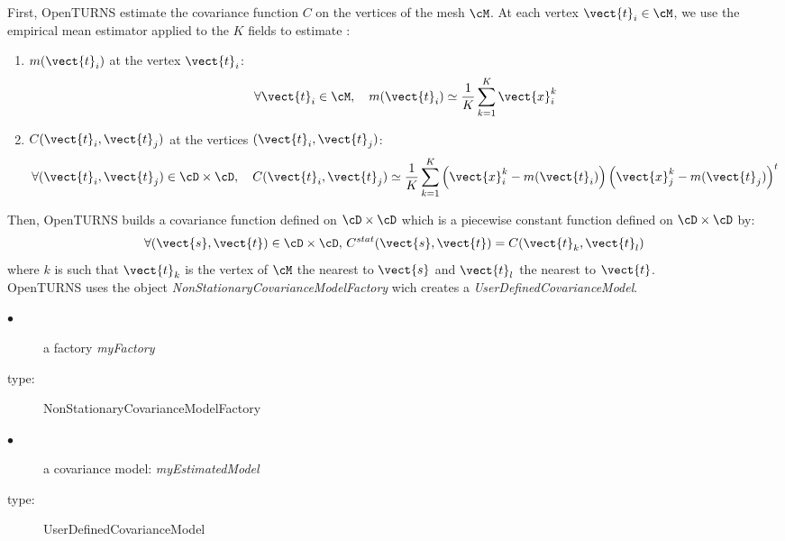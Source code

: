 First, OpenTURNS estimate the covariance function $C$ on the vertices of the mesh $\cM$. At each vertex $\vect{t}_i \in \cM$, we use the empirical mean estimator applied to the $K$ fields  to estimate :
\begin{enumerate}
\item  $m(\vect{t}_i)$ at the vertex $\vect{t}_i$:
  \begin{equation}\label{meanestim}
    \displaystyle  \forall \vect{t}_i \in \cM, \quad m(\vect{t}_i) \simeq \frac{1}{K} \sum_{k=1}^{K} \vect{x}_i^k
  \end{equation}

\item $C(\vect{t}_i, \vect{t}_j)$ at the vertices $(\vect{t}_i, \vect{t}_j)$:
  \begin{equation}\label{covEstm}
    \displaystyle \forall (\vect{t}_i, \vect{t}_j) \in \cD \times \cD, \quad C(\vect{t}_i, \vect{t}_j) \simeq \frac{1}{K} \sum_{k=1}^{K} \left( \vect{x}_i^k -  m(\vect{t}_i) \right) \left( \vect{x}_j^k -  m(\vect{t}_j) \right)^t
  \end{equation}
\end{enumerate}
Then,  OpenTURNS builds a covariance function defined on $\cD \times \cD$  which is a  piecewise constant function defined on $\cD \times \cD$ by:
\begin{align*}
  \forall (\vect{s}, \vect{t}) \in \cD \times \cD, \, C^{stat}(\vect{s}, \vect{t}) =  C(\vect{t}_k, \vect{t}_l)
\end{align*}
where $k$ is such that $\vect{t}_k$ is the  vertex of $\cM$ the nearest to $\vect{s}$ and $\vect{t}_l$ the nearest to $\vect{t}$.\\


OpenTURNS uses the object \textit{NonStationaryCovarianceModelFactory} wich creates a \newline \textit{UserDefinedCovarianceModel}.\\


{
  \begin{description}
  \item[$\bullet$] a factory {\itshape myFactory}
  \item[type:]  NonStationaryCovarianceModelFactory
  \end{description}

  \begin{description}
  \item[$\bullet$] a covariance model: {\itshape  myEstimatedModel}
  \item[type:]  UserDefinedCovarianceModel
  \end{description}
}

